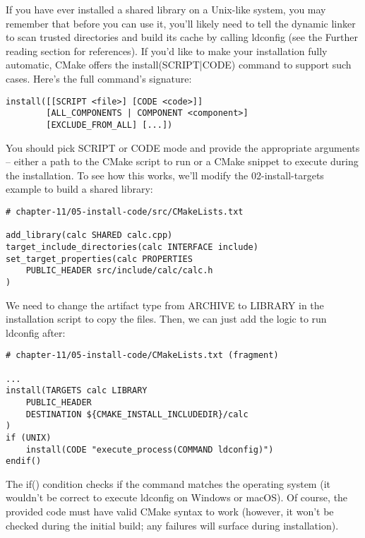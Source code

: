 
If you have ever installed a shared library on a Unix-like system, you may remember that before you can use it, you'll likely need to tell the dynamic linker to scan trusted directories and build its cache by calling ldconfig (see the Further reading section for references). If you'd like to make your installation fully automatic, CMake offers the install(SCRIPT|CODE) command to support such cases. Here's the full command's signature:

\begin{lstlisting}[style=styleCMake]
install([[SCRIPT <file>] [CODE <code>]]
		[ALL_COMPONENTS | COMPONENT <component>]
		[EXCLUDE_FROM_ALL] [...])
\end{lstlisting}

You should pick SCRIPT or CODE mode and provide the appropriate arguments – either a path to the CMake script to run or a CMake snippet to execute during the installation. To see how this works, we'll modify the 02-install-targets example to build a shared library:

\begin{lstlisting}[style=styleCMake]
# chapter-11/05-install-code/src/CMakeLists.txt

add_library(calc SHARED calc.cpp)
target_include_directories(calc INTERFACE include)
set_target_properties(calc PROPERTIES
	PUBLIC_HEADER src/include/calc/calc.h
)
\end{lstlisting}

We need to change the artifact type from ARCHIVE to LIBRARY in the installation script to copy the files. Then, we can just add the logic to run ldconfig after:

\begin{lstlisting}[style=styleCMake]
# chapter-11/05-install-code/CMakeLists.txt (fragment)

...
install(TARGETS calc LIBRARY
	PUBLIC_HEADER
	DESTINATION ${CMAKE_INSTALL_INCLUDEDIR}/calc
)
if (UNIX)
	install(CODE "execute_process(COMMAND ldconfig)")
endif()
\end{lstlisting}

The if() condition checks if the command matches the operating system (it wouldn't be correct to execute ldconfig on Windows or macOS). Of course, the provided code must have valid CMake syntax to work (however, it won't be checked during the initial build; any failures will surface during installation).

